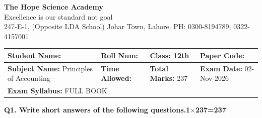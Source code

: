 \documentclass[11pt,a4paper]{article}
\begin{document}
\begin{center}
  {\Huge\bfseries The Hope Science Academy}\\[3pt]
  {\small Excellence is our standard not goal}\\[2pt]
  {\small 247-E-1, (Opposite LDA School) Johar Town, Lahore. PH: 0300-8194789, 0322-4157001}
\end{center}

\medskip
\noindent
\begin{tabularx}{\linewidth}{|X|X|X|X|}
\hline
\textbf{Student Name:} & \textbf{Roll Num:} & \textbf{Class:} 12th & \textbf{Paper Code:} \\ \hline
\textbf{Subject Name:} Principles of Accounting & \textbf{Time Allowed:} & \textbf{Total Marks:} 237 & \textbf{Exam Date:} 02-Nov-2026 \\ \hline
\multicolumn{4}{|l|}{\textbf{Exam Syllabus:} FULL BOOK} \\ \hline
\end{tabularx}

\bigskip
\noindent\textbf{Q1. Write short answers of the following questions.}\hfill\textbf{1$\times$237=237}
\end{document}
